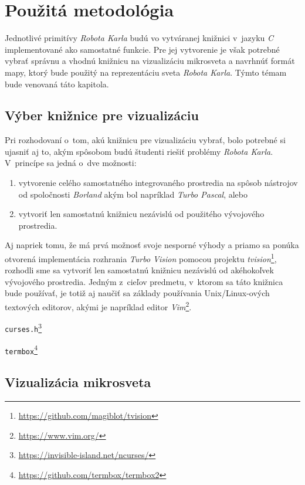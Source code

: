 
\chapter{Použitá metodológia}\label{ch:methodology}

Jednotlivé primitívy \emph{Robota Karla} budú vo vytváranej knižnici v~jazyku \emph{C} implementované ako samostatné funkcie. Pre jej vytvorenie je však potrebné vybrať správnu a vhodnú knižnicu na vizualizáciu mikrosveta a navrhnúť formát mapy, ktorý bude použitý na reprezentáciu sveta \emph{Robota Karla}. Týmto témam bude venovaná táto kapitola.


\section{Výber knižnice pre vizualizáciu}

Pri rozhodovaní o~tom, akú knižnicu pre vizualizáciu vybrať, bolo potrebné si ujasniť aj to, akým spôsobom budú študenti riešiť problémy \emph{Robota Karla}. V~princípe sa jedná o~dve možnosti:

\begin{enumerate}
   \item vytvorenie celého samostatného integrovaného prostredia na spôsob nástrojov od spoločnosti \emph{Borland} akým bol napríklad \emph{Turbo Pascal}, alebo

   \item vytvoriť len samostatnú knižnicu nezávislú od použitého vývojového prostredia.
\end{enumerate}

Aj napriek tomu, že má prvá možnosť svoje nesporné výhody a priamo sa ponúka otvorená implementácia rozhrania \emph{Turbo Vision} pomocou projektu \emph{tvision}\footnote{\url{https://github.com/magiblot/tvision}}, rozhodli sme sa vytvoriť len samostatnú knižnicu nezávislú od akéhokoľvek vývojového prostredia. Jedným z~cieľov predmetu, v~ktorom sa táto knižnica bude používať, je totiž aj naučiť sa základy používania Unix/Linux-ových textových editorov, akými je napríklad editor \emph{Vim}\footnote{\url{https://www.vim.org/}}.

\texttt{curses.h}\footnote{\url{https://invisible-island.net/ncurses/}}

\texttt{termbox}\footnote{\url{https://github.com/termbox/termbox2}}




\section{Vizualizácia mikrosveta}

